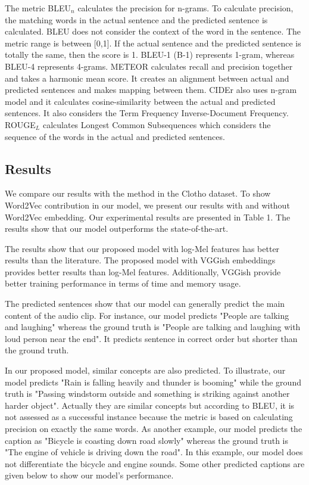 \documentclass{article}
\begin{document}
The metric BLEU${_n}$ calculates the precision for n-grams. To calculate precision, the matching words in the actual sentence and the predicted sentence is calculated. BLEU does not consider the context of the word in the sentence. The metric range is between [0,1]. If the actual sentence and the predicted sentence is totally the same, then the score is 1. BLEU-1 (B-1) represents 1-gram, whereas BLEU-4 represents 4-grams. METEOR calculates recall and precision together and takes a harmonic mean score. It creates an alignment between actual and predicted sentences and makes mapping between them. CIDEr also uses n-gram model and it calculates cosine-similarity between the actual and predicted sentences. It also considers the Term Frequency Inverse-Document Frequency. ROUGE$_L$ calculates Longest Common Subsequences which considers the sequence of the words in the actual and predicted sentences.



\subsection{Results}

We compare our results with the method in the Clotho dataset. To show Word2Vec contribution in our model, we present our results with and without Word2Vec embedding. Our experimental results are presented in Table 1. The results show that our model outperforms the state-of-the-art. 

The results show that our proposed model with log-Mel features has better results than the literature. The proposed model with VGGish embeddings provides better results than log-Mel features. Additionally, VGGish provide better training performance in terms of time and memory usage.

The predicted sentences show that our model can generally predict the main content of the audio clip. For instance, our model predicts "People are talking and laughing" whereas the ground truth is "People are talking and laughing with loud person near the end". It predicts sentence in correct order but shorter than the ground truth. 

In our proposed model, similar concepts are also predicted. To illustrate, our model predicts "Rain is falling heavily and thunder is booming" while the ground truth is "Passing windstorm outside and something is striking against another harder object". Actually they are similar concepts but according to BLEU, it is not assessed as a successful instance because the metric is based on calculating precision on exactly the same words. As another example, our model predicts the caption as "Bicycle is coasting down road slowly" whereas the ground truth is "The engine of vehicle is driving down the road". In this example, our model does not differentiate the bicycle and engine sounds. Some other predicted captions are given below to show our model’s performance.
\end{document}
